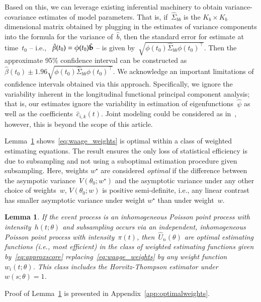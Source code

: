 \documentclass[12pt]{amsart}
\newtheorem{lemma}[thm]{Lemma}
\begin{document}
Based on this, we can leverage existing inferential machinery to obtain variance-covariance estimates of model parameters. That is, if~$\hat \Sigma_{bb}$ is the $K_b \times K_b$ dimensional matrix obtained by plugging in the estimates of variance components into the formula for the variance of~$\hat b$, then the standard error for estimate at time~$t_0$ -- i.e., ~$\hat \beta (t_0) = \phi(t_0) \hat {\bf b}$ -- is given by~$\sqrt{ \phi (t_0 ) \hat \Sigma_{bb} \phi(t_0)^\top}$.  Then the approximate 95\% confidence interval can be constructed as~$\hat \beta (t_0) \pm 1.96 \sqrt{\phi (t_0) \hat \Sigma_{bb} \phi(t_0)^\top}$.  We acknowledge an important limitations of confidence intervals obtained via this approach. Specifically, we ignore the variability inherent in the longitudinal functional principal component analysis; that is, our estimates ignore the variability in estimation of eigenfunctions~$\hat \psi$ as well as the coefficients~$\hat c_{i,k}(t)$. Joint modeling could be considered as in~\cite{Crainiceanu2010}, however, this is beyond the scope of this article.

Lemma~\ref{prop:optimal} shows~\eqref{eq:waage_weights} is optimal within a class of weighted estimating equations. The result ensures the only loss of statistical efficiency is due to subsampling and not using a suboptimal estimation procedure given subsampling.  Here, weights $w^\star$ are considered \emph{optimal} if the difference between the asympotic variance~$V (\theta_0; w^\star)$ and the asymptotic variance under any other choice of weights~$w$, $V(\theta_0; w)$ is positive semi-definite, i.e., any linear contrast has smaller asymptotic variance under weight $w^\star$ than under weight~$w$.
\begin{lemma} \normalfont
\label{prop:optimal}
If the event process is an inhomogeneous Poisson point process with intensity~$h(t; \theta)$ and subsampling occurs via an independent, inhomogeneous Poisson point process with intensity~$\pi (t)$, then~$\hat U_n (\theta)$ are optimal estimating functions (i.e., most efficient) in the class of weighted estimating functions given by~\eqref{eq:approxscore} replacing~\eqref{eq:waage_weights} by any weight function~$w_i (t; \theta)$. This class includes the Horvitz-Thompson estimator under~$w(s; \theta) = 1$.
\end{lemma}
Proof of Lemma~\ref{prop:optimal} is presented in Appendix~\ref{app:optimalweights}.
\end{document}
